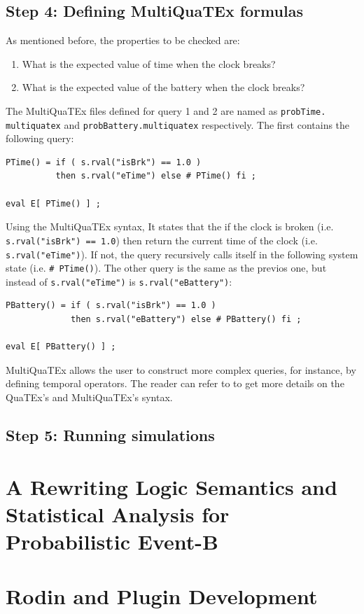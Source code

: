 \subsection{Step 4: Defining MultiQuaTEx formulas}
As mentioned before, the properties to be checked are:
\begin{enumerate}
    \item What is the expected value of time when the clock breaks?
    \item What is the expected value of the battery when the clock breaks?
\end{enumerate}
The MultiQuaTEx files defined for query 1 and 2 are named as \texttt{probTime.} \texttt{multiquatex} and \texttt{probBattery.multiquatex} respectively. The first contains the following query:
\begin{lstlisting}
PTime() = if ( s.rval("isBrk") == 1.0 ) 
          then s.rval("eTime") else # PTime() fi ;

eval E[ PTime() ] ;
\end{lstlisting}
Using the MultiQuaTEx syntax, It states that the if the clock is broken (i.e. \texttt{s.rval("isBrk") == 1.0}) then return the current time of the clock (i.e. \texttt{s.rval("eTime")}). If not, the query recursively calls itself in the following system state (i.e. \texttt{\# PTime()}). The other query is the same as the previos one, but instead of \texttt{s.rval("eTime")} is \texttt{s.rval("eBattery")}:
\begin{lstlisting}
PBattery() = if ( s.rval("isBrk") == 1.0 ) 
             then s.rval("eBattery") else # PBattery() fi ;

eval E[ PBattery() ] ;
\end{lstlisting}
MultiQuaTEx allows the user to construct more complex queries, for instance, by defining temporal operators. The reader can refer to \cite{multivesta} to get more details on the QuaTEx's and MultiQuaTEx's syntax.

\subsection{Step 5: Running simulations}





\section{A Rewriting Logic Semantics and Statistical Analysis for Probabilistic Event-B}

\section{Rodin and Plugin Development}










